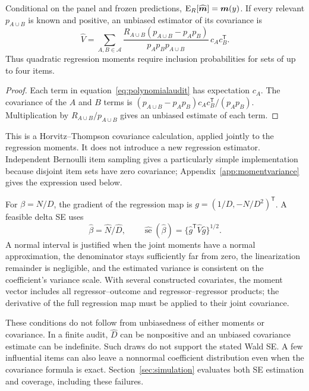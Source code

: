 \begin{proposition}\label{prop:momentcovariance}
Conditional on the panel and frozen predictions,
$\operatorname{E}_R[\widehat{\boldsymbol m}]=\boldsymbol m(y)$. If every relevant
$p_{A\cup B}$ is known and positive, an unbiased estimator of its covariance is
\begin{equation}\label{eq:polynomialvariance}
\widehat V=
\sum_{A,B\in\mathcal A}
\frac{R_{A\cup B}(p_{A\cup B}-p_Ap_B)}
     {p_Ap_Bp_{A\cup B}}\,c_Ac_B^{\mathsf T}.
\end{equation}
Thus quadratic regression moments require inclusion probabilities for
sets of up to four items.
\end{proposition}
\begin{proof}
Each term in equation~\eqref{eq:polynomialaudit} has expectation $c_A$.
The covariance of the $A$ and $B$ terms is
$(p_{A\cup B}-p_Ap_B)c_Ac_B^{\mathsf T}/(p_Ap_B)$.
Multiplication by $R_{A\cup B}/p_{A\cup B}$ gives an unbiased estimate of
each term.
\end{proof}
This is a Horvitz--Thompson covariance calculation, applied jointly to the
regression moments. It does not introduce a new regression estimator.
Independent Bernoulli item sampling gives a particularly simple
implementation because disjoint item sets have zero covariance;
Appendix~\ref{app:momentvariance} gives the expression used below.

For $\beta=N/D$, the gradient of the regression map is
$g=(1/D,-N/D^2)^{\mathsf T}$. A feasible delta SE uses
\begin{equation}\label{eq:auditratiose}
\widehat\beta=\widehat N/\widehat D,\qquad
\widehat{\operatorname{se}}(\widehat\beta)
=\{\widehat g^{\mathsf T}\widehat V\widehat g\}^{1/2}.
\end{equation}
A normal interval is justified when the joint moments have a normal
approximation, the denominator stays sufficiently far from zero, the
linearization remainder is negligible, and the estimated variance is
consistent on the coefficient's variance scale. With several constructed
covariates, the moment vector includes all regressor--outcome and
regressor--regressor products; the derivative of the full regression map
must be applied to their joint covariance.

These conditions do not follow from unbiasedness of either moments or
covariance. In a finite audit, $\widehat D$ can be nonpositive and an
unbiased covariance estimate can be indefinite. Such draws do not support
the stated Wald SE. A few influential items can also leave a nonnormal
coefficient distribution even when the covariance formula is exact.
Section~\ref{sec:simulation} evaluates both SE estimation and coverage,
including these failures.

